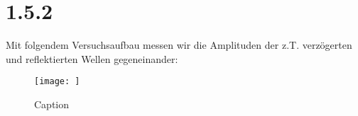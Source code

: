 \documentclass[main.tex]{subfiles}
\begin{document}
\section{1.5.2}
Mit folgendem Versuchsaufbau messen wir die Amplituden der z.T. verzögerten und reflektierten Wellen gegeneinander:
\begin{figure}
    \centering
    \texttt{[image: ]}
    \caption{Caption}
    \label{fig:my_label}
\end{figure}
\end{document}
